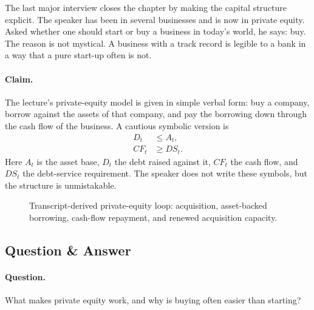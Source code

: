 The last major interview closes the chapter by making the capital structure explicit. The speaker has been in several businesses and is now in private equity. Asked whether one should start or buy a business in today's world, he says: buy. The reason is not mystical. A business with a track record is legible to a bank in a way that a pure start-up often is not.

\paragraph{Claim.} The lecture's private-equity model is given in simple verbal form: buy a company, borrow against the assets of that company, and pay the borrowing down through the cash flow of the business. A cautious symbolic version is
\begin{align}
D_t &\le A_t,\\
CF_t &\ge DS_t.
\end{align}
Here \(A_t\) is the asset base, \(D_t\) the debt raised against it, \(CF_t\) the cash flow, and \(DS_t\) the debt-service requirement. The speaker does not write these symbols, but the structure is unmistakable.

\begin{figure}[h]
\centering
{}
\caption{Transcript-derived private-equity loop: acquisition, asset-backed borrowing, cash-flow repayment, and renewed acquisition capacity.}
\end{figure}

\subsection{Question \& Answer}

\paragraph{Question.} What makes private equity work, and why is buying often easier than starting?


